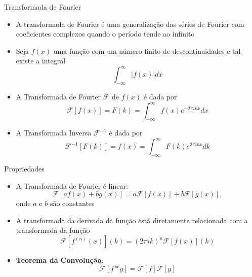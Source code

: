 \begin{frame}[fragile]{Transformada de Fourier}

    \begin{itemize}
        \item A transformada de Fourier é uma generalização das séries de Fourier com coeficientes
            complexos quando o período tende ao infinito

        \item Seja $f(x)$ uma função com um número finito de descontinuidades e tal existe a
        integral
        \[
            \int_{-\infty}^\infty |f(x)|dx
        \]

        \item A Transformada de Fourier $\mathcal{F}$ de $f(x)$ é dada por
        \[
            \mathcal{F}[f(x)] = F(k) = \int_{-\infty}^{\infty} f(x)e^{-2\pi ikx} dx
        \]
         
        \item A Transformada Inversa $\mathcal{F}^{-1}$ é dada por
        \[
            \mathcal{F}^{-1}[F(k)] = f(x) = \int_{-\infty}^{\infty} F(k)e^{2\pi ikx} dk
        \]

    \end{itemize}

\end{frame}

\begin{frame}[fragile]{Propriedades}

    \begin{itemize}
        \item A Transformada de Fourier é linear:
        \[
            \mathcal{F}[af(x) + bg(x)] = a\mathcal{F}[f(x)] + b\mathcal{F}[g(x)],
        \]
        onde $a$ e $b$ são constantes

        \item A transformada da derivada da função está diretamente relacionada com a transformada
            da função
        \[
            \mathcal{F}[f^{(n)}(x)](k) = (2\pi ik)^n\mathcal{F}[f(x)](k)
        \]

        \item \textbf{Teorema da Convolução}:
        \[
            \mathcal{F}[f*g] = \mathcal{F}[f]\mathcal{F}[g]
        \]
    \end{itemize}

\end{frame}

